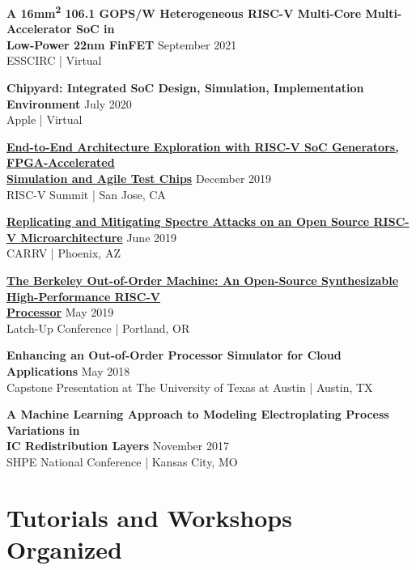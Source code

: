 \documentclass[line]{res}
\begin{document}
\begin{resume}
\textbf{A 16mm\textsuperscript{2} 106.1 GOPS/W Heterogeneous RISC-V Multi-Core Multi-Accelerator SoC in\\Low-Power 22nm FinFET} \hfill September 2021
\\
ESSCIRC | Virtual
\vspace{-1mm}

\textbf{Chipyard: Integrated SoC Design, Simulation, Implementation Environment} \hfill July 2020
\\
Apple | Virtual
\vspace{-1mm}

\textbf{\href{https://www.youtube.com/watch?v=MaSZuHhOE24}{End-to-End Architecture Exploration with RISC-V SoC Generators, FPGA-Accelerated\\Simulation and Agile Test Chips}} \hfill December 2019
\\
RISC-V Summit | San Jose, CA
\vspace{-1mm}

\textbf{\href{https://carrv.github.io/2019/}{Replicating and Mitigating Spectre Attacks on an Open Source RISC-V Microarchitecture}} \hfill June 2019
\\
CARRV | Phoenix, AZ
\vspace{-1mm}

\textbf{\href{https://youtu.be/WNf3Dq9wflQ?si=jQcMmZWhbsHAUfTB}{The Berkeley Out-of-Order Machine: An Open-Source Synthesizable High-Performance RISC-V\\Processor}} \hfill May 2019
\\
Latch-Up Conference | Portland, OR
\vspace{-1mm}

\textbf{Enhancing an Out-of-Order Processor Simulator for Cloud Applications} \hfill May 2018
\\
Capstone Presentation at The University of Texas at Austin | Austin, TX
\vspace{-1mm}

\textbf{A Machine Learning Approach to Modeling Electroplating Process Variations in\\IC Redistribution Layers} \hfill November 2017
\\
SHPE National Conference | Kansas City, MO

\section{\Large{Tutorials and Workshops Organized}}
\label{sec:tutorialsworkshops}
\vspace{2mm}


\end{resume}
\end{document}
